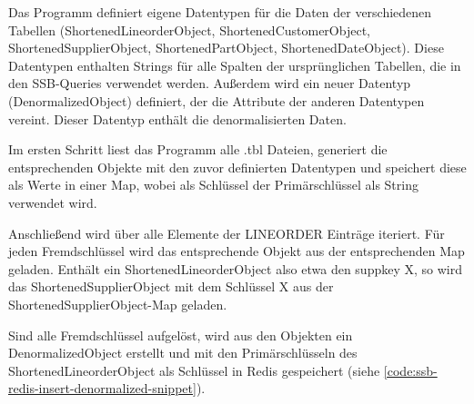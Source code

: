 Das Programm definiert eigene Datentypen für die Daten der verschiedenen Tabellen (ShortenedLineorderObject, ShortenedCustomerObject, ShortenedSupplierObject, ShortenedPartObject, ShortenedDateObject).
Diese Datentypen enthalten Strings für alle Spalten der ursprünglichen Tabellen, die in den \acs{SSB}-Queries verwendet werden.
Außerdem wird ein neuer Datentyp (DenormalizedObject) definiert, der die Attribute der anderen Datentypen vereint.
Dieser Datentyp enthält die denormalisierten Daten.

Im ersten Schritt liest das Programm alle .tbl Dateien, generiert die entsprechenden Objekte mit den zuvor definierten Datentypen und speichert diese als Werte in einer Map, wobei als Schlüssel der Primärschlüssel als String verwendet wird.

Anschließend wird über alle Elemente der LINEORDER Einträge iteriert.
Für jeden Fremdschlüssel wird das entsprechende Objekt aus der entsprechenden Map geladen.
Enthält ein ShortenedLineorderObject also etwa den suppkey X, so wird das ShortenedSupplierObject mit dem Schlüssel X aus der ShortenedSupplierObject-Map geladen.

Sind alle Fremdschlüssel aufgelöst, wird aus den Objekten ein DenormalizedObject erstellt und mit den Primärschlüsseln des ShortenedLineorderObject als Schlüssel in Redis gespeichert (siehe \cref{code:ssb-redis-insert-denormalized-snippet}).


